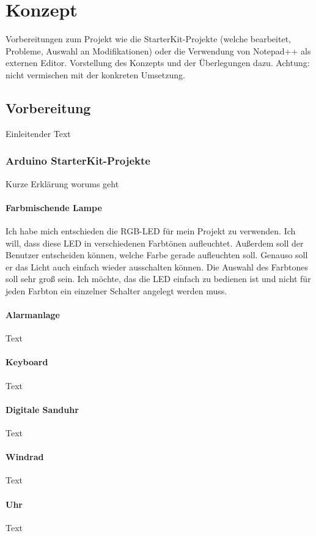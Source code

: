 \chapter{Konzept}

Vorbereitungen zum Projekt wie die StarterKit-Projekte (welche bearbeitet, Probleme, Auswahl an Modifikationen) oder die Verwendung von Notepad++ als externen Editor. Vorstellung des Konzepts und der Überlegungen dazu. Achtung: nicht vermischen mit der konkreten Umsetzung.

\section{Vorbereitung}
Einleitender Text
\subsection{Arduino StarterKit-Projekte}
Kurze Erklärung worums geht
\subsubsection{Farbmischende Lampe}
Ich habe mich entschieden die RGB-LED für mein Projekt zu verwenden. Ich will, dass diese LED in verschiedenen Farbtönen aufleuchtet. Außerdem soll der Benutzer entscheiden können, welche Farbe gerade aufleuchten soll. Genauso soll er das Licht auch einfach wieder ausschalten können. Die Auswahl des Farbtones soll sehr groß sein. Ich möchte, das die LED einfach zu bedienen ist und nicht für jeden Farbton ein einzelner Schalter angelegt werden muss. 
\subsubsection{Alarmanlage}
Text
\subsubsection{Keyboard}
Text
\subsubsection{Digitale Sanduhr}
Text
\subsubsection{Windrad}
Text
\subsubsection{Uhr}
Text